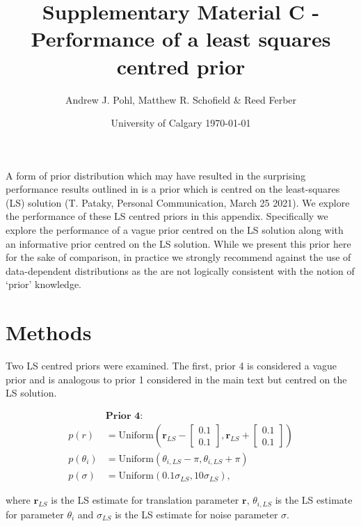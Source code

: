 \documentclass{article}
\title{Supplementary Material C - Performance of a least squares centred prior}
\author{Andrew J. Pohl, Matthew R. Schofield \&  Reed Ferber}
\date{University of Calgary \today}
\begin{document}
\linenumbers
\maketitle 

\doublespacing

A form of prior distribution which may have resulted in the surprising performance results outlined in \cite{pataky_bayesian_2019} is a prior which is centred on the least-squares (LS) solution (T. Pataky, Personal Communication, March 25 2021).  We explore the performance of these LS centred priors in this appendix.  Specifically we explore the performance of a vague prior centred on the LS solution along with an informative prior centred on the LS solution.  While we present this prior here for the sake of comparison, in practice we strongly recommend against the use of data-dependent distributions as the are not logically consistent with the notion of `prior' knowledge.

\section{Methods}
Two LS centred priors were examined.  The first, prior 4 is considered a vague prior and is analogous to prior 1 considered in the main text but centred on the LS solution. 
\begin{linenomath}
	\begin{equation}
	\begin{split}
	&\textbf{Prior 4:}\\
	p(r) &= \text{Uniform}\left(\bm{r}_{LS}-\begin{bmatrix}0.1\\0.1 \end{bmatrix}, \bm{r}_{LS}+\begin{bmatrix}0.1\\0.1 \end{bmatrix}\right) \\
	p(\theta_i) &= \text{Uniform}\left(\theta_{i, LS}-\pi, \theta_{i, LS}+\pi\right)\\
	p(\sigma) &=\text{Uniform}\left(0.1\sigma_{LS}, 10\sigma_{LS}\right),
	\end{split} \label{eqn:P4}
	\end{equation}
\end{linenomath}
where $\bm{r}_{LS}$ is the LS estimate for translation parameter $\bm{r}$, $\theta_{i, LS}$ is the LS estimate for parameter $\theta_i$ and $\sigma_{LS}$ is the LS estimate for noise parameter $\sigma$.
\end{document}

